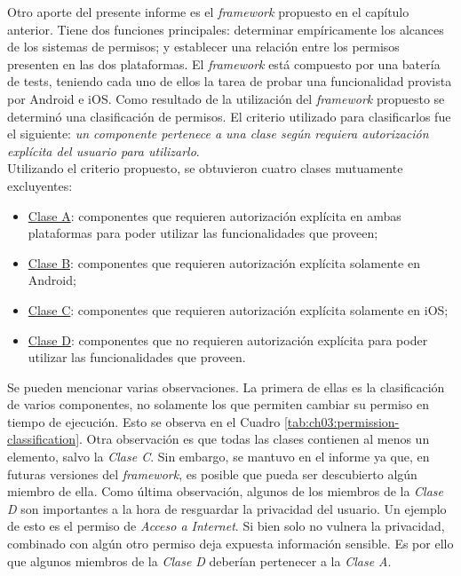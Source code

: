 Otro aporte del presente informe es el \emph{framework} propuesto en el capítulo anterior. Tiene dos funciones principales: determinar empíricamente los alcances de los sistemas de permisos; y establecer una relación entre los permisos presenten en las dos plataformas. El \emph{framework} está compuesto por una batería de tests, teniendo cada uno de ellos la tarea de probar una funcionalidad provista por Android e iOS. Como resultado de la utilización del \emph{framework} propuesto se determinó una clasificación de permisos. El criterio utilizado para clasificarlos fue el siguiente: \emph{un componente pertenece a una clase según requiera autorización explícita del usuario para utilizarlo}.\\

Utilizando el criterio propuesto, se obtuvieron cuatro clases mutuamente excluyentes:
\begin{itemize}
    \item \underline{Clase A}: componentes que requieren autorización explícita en ambas plataformas para poder utilizar las funcionalidades que proveen;
    \item \underline{Clase B}: componentes que requieren autorización explícita solamente en Android;
    \item \underline{Clase C}: componentes que requieren autorización explícita solamente en iOS;
    \item \underline{Clase D}: componentes que no requieren autorización explícita para poder utilizar las funcionalidades que proveen.
\end{itemize}
Se pueden mencionar varias observaciones. La primera de ellas es la clasificación de varios componentes, no solamente los que permiten cambiar su permiso en tiempo de ejecución. Esto se observa en el Cuadro \ref{tab:ch03:permission-classification}. Otra observación es que todas las clases contienen al menos un elemento, salvo la \emph{Clase C}. Sin embargo, se mantuvo en el informe ya que, en futuras versiones del \emph{framework}, es posible que pueda ser descubierto algún miembro de ella. Como última observación, algunos de los miembros de la \emph{Clase D} son importantes a la hora de resguardar la privacidad del usuario. Un ejemplo de esto es el permiso de \emph{Acceso a Internet}. Si bien solo no vulnera la privacidad, combinado con algún otro permiso deja expuesta información sensible. Es por ello que algunos miembros de la \emph{Clase D} deberían pertenecer a la \emph{Clase A}.\\

